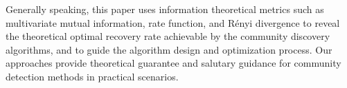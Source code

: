 \begin{abstract*}
  Generally speaking, this paper uses information theoretical metrics such as multivariate mutual information,
  rate function, and Rényi divergence to reveal the theoretical
  optimal recovery rate achievable by the community discovery algorithms,
  and to guide the algorithm design and optimization process.
  Our approaches provide theoretical guarantee and salutary guidance
  for community detection methods in practical scenarios.
\end{abstract*}
